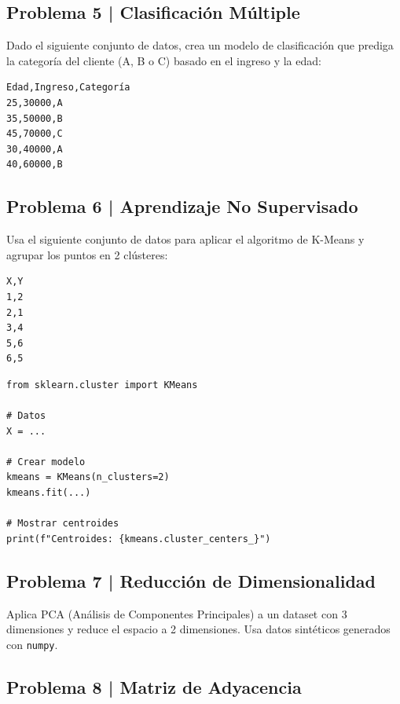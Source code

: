 \documentclass{article}
\begin{document}
\clearpage

\subsection*{Problema 5 | Clasificación Múltiple}

Dado el siguiente conjunto de datos, crea un modelo de clasificación que prediga la categoría del cliente (A, B o C) basado en el ingreso y la edad:

\begin{verbatim}
Edad,Ingreso,Categoría
25,30000,A
35,50000,B
45,70000,C
30,40000,A
40,60000,B
\end{verbatim}

\clearpage

\subsection*{Problema 6 | Aprendizaje No Supervisado}

Usa el siguiente conjunto de datos para aplicar el algoritmo de K-Means y agrupar los puntos en 2 clústeres:

\begin{verbatim}
X,Y
1,2
2,1
3,4
5,6
6,5
\end{verbatim}

\begin{lstlisting}[style=python]
from sklearn.cluster import KMeans

# Datos
X = ...

# Crear modelo
kmeans = KMeans(n_clusters=2)
kmeans.fit(...)

# Mostrar centroides
print(f"Centroides: {kmeans.cluster_centers_}")
\end{lstlisting}

\clearpage

\subsection*{Problema 7 | Reducción de Dimensionalidad}

Aplica PCA (Análisis de Componentes Principales) a un dataset con 3 dimensiones y reduce el espacio a 2 dimensiones. Usa datos sintéticos generados con \texttt{numpy}.

\clearpage

\subsection*{Problema 8 | Matriz de Adyacencia}
\end{document}
